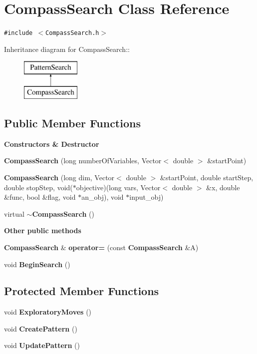 \section{Compass\-Search Class Reference}
\label{classCompassSearch}
{\tt \#include $<$Compass\-Search.h$>$}

Inheritance diagram for Compass\-Search::\begin{figure}[H]
\begin{center}
\leavevmode
\includegraphics[height=2cm]{classCompassSearch}
\end{center}
\end{figure}
\subsection*{Public Member Functions}
\begin{Indent}{\bf Constructors \& Destructor}\par
\begin{CompactItemize}
\item 
{\bf Compass\-Search} (long number\-Of\-Variables, Vector$<$ double $>$ \&start\-Point)
\item 
{\bf Compass\-Search} (long dim, Vector$<$ double $>$ \&start\-Point, double start\-Step, double stop\-Step, void($\ast$objective)(long vars, Vector$<$ double $>$ \&x, double \&func, bool \&flag, void $\ast$an\_\-obj), void $\ast$input\_\-obj)
\item 
virtual {\bf $\sim$Compass\-Search} ()
\end{CompactItemize}
\end{Indent}
\begin{Indent}{\bf Other public methods}\par
\begin{CompactItemize}
\item 
{\bf Compass\-Search} \& {\bf operator=} (const {\bf Compass\-Search} \&A)
\item 
void {\bf Begin\-Search} ()
\end{CompactItemize}
\end{Indent}
\subsection*{Protected Member Functions}
\begin{CompactItemize}
\item 
void {\bf Exploratory\-Moves} ()
\item 
void {\bf Create\-Pattern} ()
\item 
void {\bf Update\-Pattern} ()
\end{CompactItemize}


